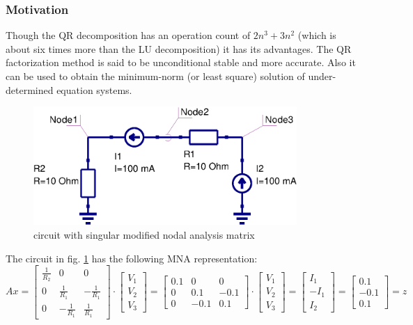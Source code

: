 \subsubsection{Motivation}

Though the QR decomposition has an operation count of $2n^3 + 3n^2$
(which is about six times more than the LU decomposition) it has its
advantages.  The QR factorization method is said to be unconditional
stable and more accurate.  Also it can be used to obtain the
minimum-norm (or least square) solution of under-determined equation
systems.
\begin{figure}[ht]
\begin{center}
\includegraphics[width=10cm]{MNAsingular}
\end{center}
\caption{circuit with singular modified nodal analysis matrix}
\label{fig:MNAsingular}
\end{figure}
\FloatBarrier

The circuit in fig. \ref{fig:MNAsingular} has the following MNA
representation:
\begin{equation}
A x =
\begin{bmatrix}
\frac{1}{R_{2}} & 0 & 0\\
0 & \frac{1}{R_{1}} & -\frac{1}{R_{1}}\\
0 & -\frac{1}{R_{1}} & \frac{1}{R_{1}}
\end{bmatrix}
\cdot
\begin{bmatrix}
V_1\\
V_2\\
V_3
\end{bmatrix}
=
\begin{bmatrix}
0.1 & 0 & 0\\
0 & 0.1 & -0.1\\
0 & -0.1 & 0.1
\end{bmatrix}
\cdot
\begin{bmatrix}
V_1\\
V_2\\
V_3
\end{bmatrix}
=
\begin{bmatrix}
I_1\\
-I_1\\
I_2
\end{bmatrix}
=
\begin{bmatrix}
0.1\\
-0.1\\
0.1
\end{bmatrix}
=
z
\end{equation}

